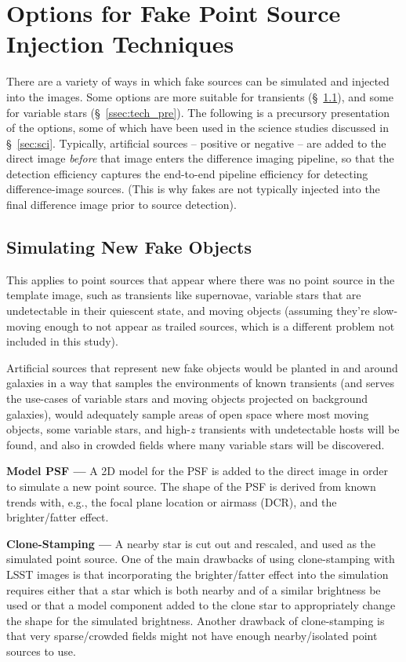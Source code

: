 \section{Options for Fake Point Source Injection Techniques}\label{sec:tech}

There are a variety of ways in which fake sources can be simulated and injected into the images. Some options are more suitable for transients (\S~\ref{ssec:tech_new}), and some for variable stars (\S~\ref{ssec:tech_pre}). The following is a precursory presentation of the options, some of which have been used in the science studies discussed in \S~\ref{sec:sci}. Typically, artificial sources -- positive or negative -- are added to the direct image {\it before} that image enters the difference imaging pipeline, so that the detection efficiency captures the end-to-end pipeline efficiency for detecting difference-image sources. (This is why fakes are not typically injected into the final difference image prior to source detection).

\subsection{Simulating New Fake Objects}\label{ssec:tech_new}

This applies to point sources that appear where there was no point source in the template image, such as transients like supernovae, variable stars that are undetectable in their quiescent state, and moving objects (assuming they're slow-moving enough to not appear as trailed sources, which is a different problem not included in this study). 

Artificial sources that represent new fake objects would be planted in and around galaxies in a way that samples the environments of known transients (and serves the use-cases of variable stars and moving objects projected on background galaxies), would adequately sample areas of open space where most moving objects, some variable stars, and high-$z$ transients with undetectable hosts will be found, and also in crowded fields where many variable stars will be discovered.

{\bf Model PSF ---} A 2D model for the PSF is added to the direct image in order to simulate a new point source. The shape of the PSF is derived from known trends with, e.g., the focal plane location or airmass (DCR), and the brighter/fatter effect.

{\bf Clone-Stamping ---} A nearby star is cut out and rescaled, and used as the simulated point source. One of the main drawbacks of using clone-stamping with LSST images is that incorporating the brighter/fatter effect into the simulation requires either that a star which is both nearby and of a similar brightness be used or that a model component added to the clone star to appropriately change the shape for the simulated brightness. Another drawback of clone-stamping is that very sparse/crowded fields might not have enough nearby/isolated point sources to use.

